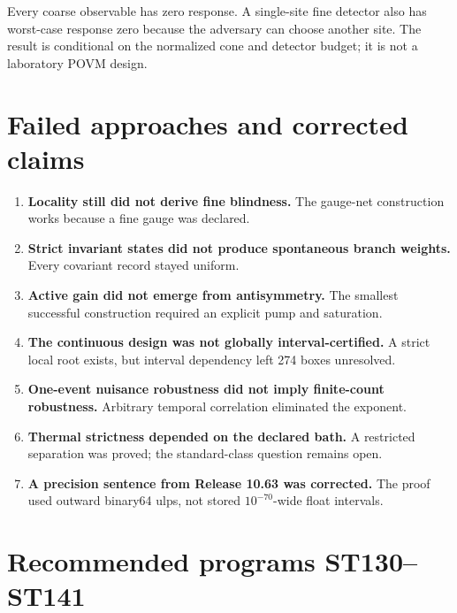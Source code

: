 \documentclass[11pt,a4paper]{article}
\begin{document}
Every coarse observable has zero response. A single-site fine detector also has worst-case response zero because the adversary can choose another site. The result is conditional on the normalized cone and detector budget; it is not a laboratory POVM design.

\section{Failed approaches and corrected claims}

\begin{enumerate}
\item \textbf{Locality still did not derive fine blindness.} The gauge-net construction works because a fine gauge was declared.
\item \textbf{Strict invariant states did not produce spontaneous branch weights.} Every covariant record stayed uniform.
\item \textbf{Active gain did not emerge from antisymmetry.} The smallest successful construction required an explicit pump and saturation.
\item \textbf{The continuous design was not globally interval-certified.} A strict local root exists, but interval dependency left 274 boxes unresolved.
\item \textbf{One-event nuisance robustness did not imply finite-count robustness.} Arbitrary temporal correlation eliminated the exponent.
\item \textbf{Thermal strictness depended on the declared bath.} A restricted separation was proved; the standard-class question remains open.
\item \textbf{A precision sentence from Release 10.63 was corrected.} The proof used outward binary64 ulps, not stored $10^{-70}$-wide float intervals.
\end{enumerate}

\section{Recommended programs ST130--ST141}
\end{document}
